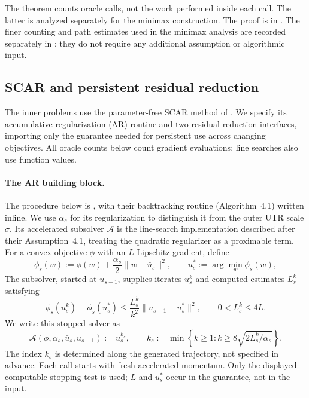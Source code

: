 \documentclass{article}
\begin{document}
The theorem counts oracle calls, not the work performed inside each
call.  The latter is analyzed separately for the minimax construction.
The proof is in .
The finer counting and path estimates used in the minimax analysis
are recorded separately in ; they do not
require any additional assumption or algorithmic input.

\subsection{SCAR and persistent residual reduction}
\label{sec:scar-tool}

The inner problems use the parameter-free SCAR method of
\citet{lan2026optimal}.  We specify its accumulative regularization
(AR) routine and two residual-reduction interfaces, importing only
the guarantee needed for persistent use across changing objectives.
All oracle counts below count gradient evaluations; line searches
also use function values.

\paragraph{The AR building block.}
The procedure below is \citet[Algorithm~4.2]{lan2026optimal}, with
their backtracking routine (Algorithm~4.1) written inline.  We use
$\alpha_s$ for its regularization to distinguish it from the outer
UTR scale $\sigma$.  Its accelerated subsolver $\mathcal A$ is the
line-search implementation described after their Assumption~4.1,
treating the quadratic regularizer as a proximable term.
For a convex objective $\phi$ with an $L$-Lipschitz gradient, define
\[
 \phi_s(w):=\phi(w)+\frac{\alpha_s}{2}\|w-\bar u_s\|^2,
 \qquad u_s^*:=\arg\min_w\phi_s(w),
\]
The subsolver, started at $u_{s-1}$, supplies iterates $u_s^k$ and
computed estimates $L_s^k$ satisfying
\begin{equation}\label{eq:scar-agd-interface}
 \phi_s(u_s^k)-\phi_s(u_s^*)
 \le\frac{L_s^k}{k^2}\|u_{s-1}-u_s^*\|^2,
 \qquad 0<L_s^k\le4L.
\end{equation}
We write this stopped solver as
\[
 \mathcal A(\phi,\alpha_s,\bar u_s,u_{s-1}):=u_s^{k_s},
 \qquad
 k_s:=\min\left\{k\ge1:
       k\ge8\sqrt{2L_s^k/\alpha_s}\right\}.
\]
The index $k_s$ is determined along the generated trajectory, not
specified in advance.  Each call starts with fresh accelerated
momentum.  Only the displayed computable stopping test is used;
$L$ and $u_s^*$ occur in the guarantee, not in the input.
\end{document}
